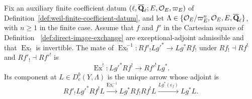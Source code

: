 
\begin{definition}
\label{def:exceptional-pullback-exchange}


Fix an auxiliary finite coefficient datum
\((\ell,\overline{\mathbf Q}_\ell;E,\mathcal O_E,\varpi_E)\) of
Definition~\ref{def:weil-finite-coefficient-datum}, and let
\(\Lambda\in\{\mathcal O_E/\varpi_E^n,\mathcal O_E,E,\overline{\mathbf Q}_\ell\}\), with
\(n\geq1\) in the finite case.  Assume that \(f\) and \(f'\) in the
Cartesian square of Definition
~\ref{def:direct-image-exchange} are exceptional-adjoint admissible and that
\(\operatorname{Ex}_!\) is invertible.  The mate of
\(\operatorname{Ex}_!^{-1}:Rf'_!Lg'^*\to Lg^*Rf_!\) under
\(Rf_!\dashv Rf^!\) and \(Rf'_!\dashv Rf'^!\) is
\[
 \operatorname{Ex}^{!}:Lg'^*Rf^!\longrightarrow Rf'^!Lg^*.
\]
Its component at \(L\in D^b_c(Y,\Lambda)\) is the unique arrow whose
adjoint is
\[
 Rf'_!Lg'^*Rf^!L
 \xrightarrow{\operatorname{Ex}_!^{-1}}
 Lg^*Rf_!Rf^!L
 \xrightarrow{Lg^*(\epsilon_f)}Lg^*L.
\]
\end{definition}


